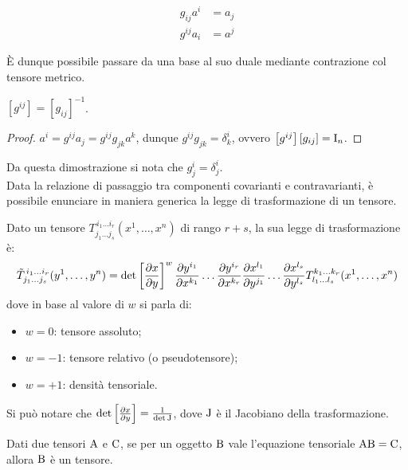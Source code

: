 \begin{equation}
	\begin{split}
		g_{ij} a^i &= a_j \\
		g^{ij} a_i &= a^j
	\end{split}
	\label{eq:12}
\end{equation}

È dunque possibile passare da una base al suo duale mediante contrazione col tensore metrico.

\begin{proposition}
	$ \left[g^{ij}\right] = \left[g_{ij}\right]^{-1} $.
\end{proposition}
\begin{proof}
	$ a^i = g^{ij} a_j = g^{ij} g_{jk} a^k $, dunque $ g^{ij} g_{jk} = \delta^i_k $, ovvero $ \left[g^{ij}\right]\left[g_{ij}\right] = \mathbf{\text{I}}_n $.
\end{proof}

Da questa dimostrazione si nota che $ g^i_j = \delta^i_j $.\\
Data la relazione di passaggio tra componenti covarianti e contravarianti, è possibile enunciare in maniera generica la legge di trasformazione di un tensore.

\begin{definition}
	Dato un tensore $ T^{\,i_1 \dots i_r}_{j_1 \dots j_s} (x^1, \dots, x^n) $ di rango $ r+s $, la sua legge di trasformazione è:
	\begin{equation}
		\tilde{T}^{\,i_1 \dots i_r}_{j_1 \dots j_s} (y^1, \dots, y^n) = \det\left[\frac{\partial x}{\partial y}\right]^w \frac{\partial y^{i_1}}{\partial x^{k_1}} \dots \frac{\partial y^{i_r}}{\partial x^{k_r}} \frac{\partial x^{l_1}}{\partial y^{j_1}} \dots \frac{\partial x^{l_s}}{\partial y^{l_s}} T^{k_1 \dots k_r}_{l_1 \dots l_s} (x^1, \dots, x^n)
		\label{eq:13}
	\end{equation}
	dove in base al valore di $ w $ si parla di:
	\begin{itemize}
		\item $ w = 0 $: tensore assoluto;
		\item $ w = -1 $: tensore relativo (o pseudotensore);
		\item $ w = +1 $: densità tensoriale.
	\end{itemize}
\end{definition}

Si può notare che $ \det\left[\frac{\partial x}{\partial y}\right] = \frac{1}{\det\mathbf{\text{J}}} $, dove $ \mathbf{\text{J}} $ è il Jacobiano della trasformazione.

\begin{theorem}
	Dati due tensori $ \mathbf{\text{A}} $ e $ \mathbf{\text{C}} $, se per un oggetto $ \mathbf{\text{B}} $ vale l'equazione tensoriale $ \mathbf{\text{A}}\mathbf{\text{B}} = \mathbf{\text{C}} $, allora $ \mathbf{\text{B}} $ è un tensore.
\end{theorem}

